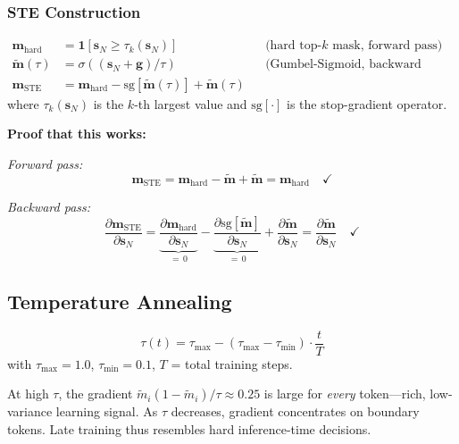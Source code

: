 \documentclass[11pt,a4paper]{article}
\newcommand{\sg}[1]{\mathrm{sg}\!\left[#1\right]}
\newcommand{\vm}{\mathbf{m}}
\newcommand{\vs}{\mathbf{s}}
\begin{document}
\subsubsection{STE Construction}

\begin{definitionbox}[title={Straight-Through Estimator for Top-$k$}]
\begin{align}
  \vm_{\text{hard}} &= \mathbf{1}[\vs_N \geq \tau_k(\vs_N)]
    && \text{(hard top-}k\text{ mask, forward pass)}
    \label{eq:hard} \\[3pt]
  \tilde{\vm}(\tau) &= \sigma((\vs_N + \mathbf{g})/\tau)
    && \text{(Gumbel-Sigmoid, backward pass)}
    \label{eq:soft} \\[3pt]
  \vm_{\text{STE}} &= \vm_{\text{hard}} - \sg{\tilde{\vm}(\tau)}
    + \tilde{\vm}(\tau)
    \label{eq:ste}
\end{align}
where $\tau_k(\vs_N)$ is the $k$-th largest value and $\sg{\cdot}$ is the
stop-gradient operator.
\end{definitionbox}

\textbf{Proof that this works:}

\emph{Forward pass:}
\begin{equation}
  \vm_{\text{STE}} = \vm_{\text{hard}} - \tilde{\vm} + \tilde{\vm}
    = \vm_{\text{hard}} \quad \checkmark
\end{equation}

\emph{Backward pass:}
\begin{equation}
  \frac{\partial \vm_{\text{STE}}}{\partial \vs_N}
    = \underbrace{
      \frac{\partial \vm_{\text{hard}}}{\partial \vs_N}
    }_{=\,0}
    - \underbrace{
      \frac{\partial \sg{\tilde{\vm}}}{\partial \vs_N}
    }_{=\,0}
    + \frac{\partial \tilde{\vm}}{\partial \vs_N}
    = \frac{\partial \tilde{\vm}}{\partial \vs_N}
    \quad \checkmark
\end{equation}

\subsection{Temperature Annealing}

\begin{equation}
  \tau(t) = \tau_{\max} - (\tau_{\max} - \tau_{\min}) \cdot \frac{t}{T}
  \label{eq:tau_schedule}
\end{equation}
with $\tau_{\max} = 1.0$, $\tau_{\min} = 0.1$, $T$ = total training steps.

\begin{notebox}[title={Why anneal?}]
At high $\tau$, the gradient $\tilde{m}_i(1{-}\tilde{m}_i)/\tau \approx 0.25$
is large for \emph{every} token---rich, low-variance learning signal.
As $\tau$ decreases, gradient concentrates on boundary tokens. Late
training thus resembles hard inference-time decisions.
\end{notebox}
\end{document}
